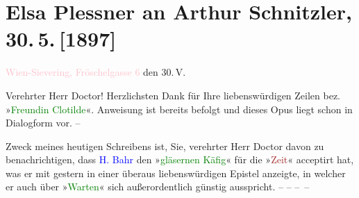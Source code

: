 

\renewcommand{\erwaehntePersonen}{Personen: Hermann Bahr, Elsa Plessner, Jean-Jacques Rousseau, Johanna Schopenhauer}
\renewcommand{\erwaehnteInstitutionen}{Institutionen: Die Zeit. Wiener Wochenschrift}
\renewcommand{\erwaehnteOrte}{Orte: Fröschelgasse 6, London, Wien}
\renewcommand{\erwaehnteWerke}{Werke: Der gläserne Käfig. Eine Parabel, Gabriele. Ein Roman, Julie oder Die neue Heloise, Meine Freundin Klothilde, Sämmtliche Schriften, Warten}
\section[Elsa Plessner an Arthur Schnitzler, 30. 5. {[}1897{]}]{Elsa Plessner an Arthur Schnitzler, 30. 5. {[}1897{]}}
\nopagebreak{}
\rehead{ }\normalsize\beginnumbering{}
\toendnotes[C]{\smallbreak\pagebreak[2]}
\toendnotes[C]{\smallbreak}
\pstart
           \textcolor{pink}{Wien-Sievering, Fröschelgasse 6}{}\ledrightnote{\textcolor{pink}{Fröschelgasse 6}}
                        den 30. V.\pend
           
\pstart\center{}Verehrter Herr Doctor!\pend\vspace{0.5em}
\pstart
           Herzlichsten Dank für Ihre liebenswürdigen Zeilen bez. »\textcolor{green}{Freundin Clotilde}{}\ledrightnote{\textcolor{green}{Meine Freundin Klothilde}}«. Anweisung ist bereits befolgt und
                    dieses Opus liegt schon in Dialogform vor. –\pend
           
\pstart
           Zweck meines heutigen Schreibens ist, Sie, verehrter Herr Doctor davon zu
                    benachrichtigen, dass \textcolor{blue}{H. Bahr}{}\ledrightnote{\textcolor{blue}{Hermann Bahr}} den »\textcolor{green}{gläsernen Käfig}{}\ledrightnote{\textcolor{green}{Der gläserne Käfig. Eine Parabel}}« für die {\pb}»\textcolor{brown}{Zeit}{}\ledrightnote{\textcolor{brown}{Die Zeit. Wiener Wochenschrift}}« acceptirt hat, was er mit gestern in
                    einer überaus liebenswürdigen Epistel anzeigte, in welcher er auch über »\textcolor{green}{Warten}{}\ledrightnote{\textcolor{green}{Warten}}« sich außerordentlich günstig
                    ausspricht. – – – –\pend
           
